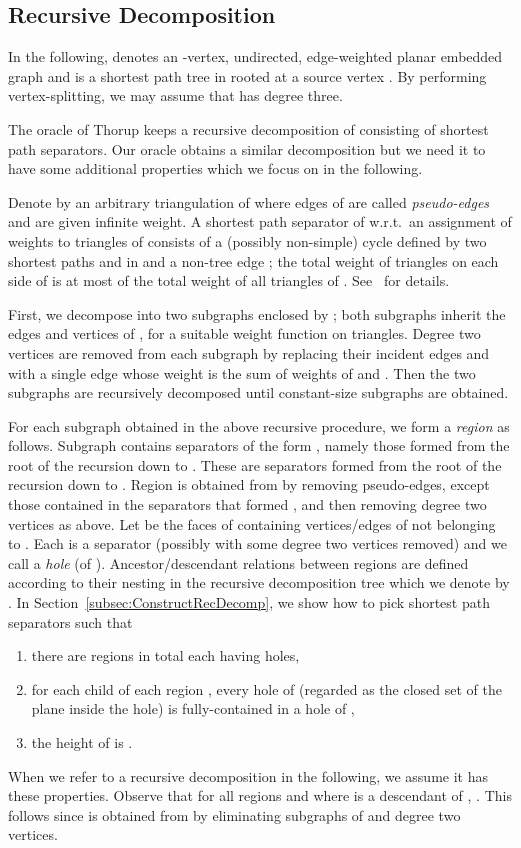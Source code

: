 \documentclass[11pt]{article}
\begin{document}
\subsection{Recursive Decomposition}\label{subsec:RecDecomp}
In the following,  denotes an -vertex, undirected, edge-weighted planar embedded graph and  is a shortest path tree in  rooted at a source vertex . By performing vertex-splitting, we may assume that  has degree three.

The oracle of Thorup keeps a recursive decomposition of  consisting of shortest path separators. Our oracle obtains a similar decomposition but we need it to have some additional properties which we focus on in the following.

Denote by  an arbitrary triangulation of  where edges of  are called \emph{pseudo-edges} and are given infinite weight. A shortest path separator of  w.r.t.~an assignment of weights to triangles of  consists of a (possibly non-simple) cycle  defined by two shortest paths  and  in  and a non-tree edge ; the total weight of triangles on each side of  is at most  of the total weight of all triangles of . See~\cite{LiptonTarjan,OraclePlanarThorup} for details.

First, we decompose  into two subgraphs enclosed by ; both subgraphs inherit the edges and vertices of , for a suitable weight function on triangles. Degree two vertices  are removed from each subgraph by replacing their incident edges  and  with a single edge  whose weight is the sum of weights of  and . Then the two subgraphs are recursively decomposed until constant-size subgraphs are obtained.

For each subgraph  obtained in the above recursive procedure, we form a \emph{region}  as follows. Subgraph  contains  separators of the form , namely those formed from the root of the recursion down to . These are separators formed from the root of the recursion down to . Region  is obtained from  by removing pseudo-edges, except those contained in the separators that formed , and then removing degree two vertices as above. Let  be the faces of  containing vertices/edges of  not belonging to . Each  is a separator  (possibly with some degree two vertices removed) and we call  a \emph{hole} (of ). Ancestor/descendant relations between regions are defined according to their nesting in the recursive decomposition tree which we denote by . In Section~\ref{subsec:ConstructRecDecomp}, we show how to pick shortest path separators such that
\begin{enumerate}
\item there are  regions in total each having  holes,
\item for each child  of each region , every hole of  (regarded as the closed set of the plane inside the hole) is fully-contained in a hole of ,
\item the height of  is .
\end{enumerate}
When we refer to a recursive decomposition in the following, we assume it has these properties. Observe that for all regions  and  where  is a descendant of , . This follows since  is obtained from  by eliminating subgraphs of  and degree two vertices.
\end{document}

